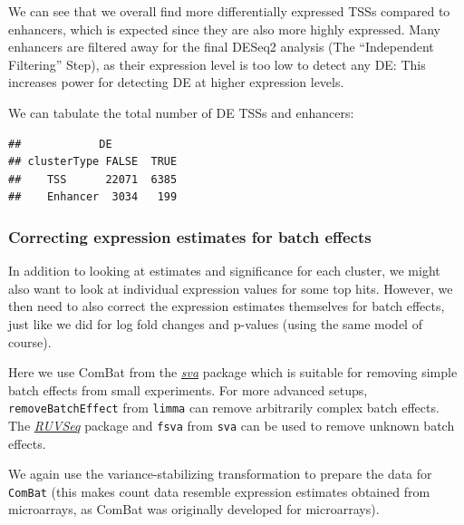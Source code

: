 \documentclass[9pt,a4paper,]{extarticle}
\newenvironment{Shaded}{\begin{snugshade}}{\end{snugshade}}
\newcommand{\KeywordTok}[1]{\textcolor[rgb]{0.13,0.29,0.53}{\textbf{{#1}}}}
\newcommand{\DataTypeTok}[1]{\textcolor[rgb]{0.13,0.29,0.53}{{#1}}}
\newcommand{\FloatTok}[1]{\textcolor[rgb]{0.00,0.00,0.81}{{#1}}}
\newcommand{\NormalTok}[1]{{#1}}
\begin{document}
We can see that we overall find more differentially expressed TSSs compared to enhancers, which is expected since they are also more highly expressed. Many enhancers are filtered away for the final DESeq2 analysis (The ``Independent Filtering'' Step), as their expression level is too low to detect any DE: This increases power for detecting DE at higher expression levels.

We can tabulate the total number of DE TSSs and enhancers:

\begin{Shaded}
\end{Shaded}

\begin{verbatim}
##            DE
## clusterType FALSE  TRUE
##    TSS      22071  6385
##    Enhancer  3034   199
\end{verbatim}

\subsubsection{Correcting expression estimates for batch effects}\label{correcting-expression-estimates-for-batch-effects}

In addition to looking at estimates and significance for each cluster, we might also want to look at individual expression values for some top hits. However, we then need to also correct the expression estimates themselves for batch effects, just like we did for log fold changes and p-values (using the same model of course).

Here we use ComBat\citep{Johnson2007} from the \emph{\href{https://bioconductor.org/packages/3.8/sva}{sva}} package which is suitable for removing simple batch effects from small experiments. For more advanced setups, \texttt{removeBatchEffect} from \texttt{limma} can remove arbitrarily complex batch effects. The \emph{\href{https://bioconductor.org/packages/3.8/RUVSeq}{RUVSeq}} package and \texttt{fsva} from \texttt{sva} can be used to remove unknown batch effects.

We again use the variance-stabilizing transformation to prepare the data for \texttt{ComBat} (this makes count data resemble expression estimates obtained from microarrays, as ComBat was originally developed for microarrays).
\end{document}
